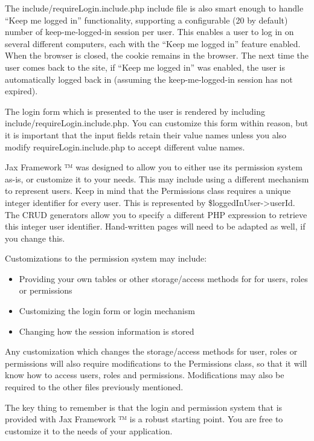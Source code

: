 \documentclass[letterpaper,10pt,english]{sphinxmanual}
\begin{document}
The include/requireLogin.include.php include file is also smart enough to handle ``Keep me logged in''
functionality, supporting a configurable (20 by default) number of keep-me-logged-in session per
user.  This enables a user to log in on several different computers, each with the ``Keep me logged
in'' feature enabled.  When the browser is closed, the cookie remains in the browser.  The next time
the user comes back to the site, if ``Keep me logged in'' was enabled, the user is automatically
logged back in (assuming the keep-me-logged-in session has not expired).

The login form which is presented to the user is rendered by including
include/requireLogin.include.php.  You can customize this form within reason, but it is important
that the input fields retain their value names unless you also modify requireLogin.include.php to
accept different value names.

Jax Framework ™ was designed to allow you to either use its permission system as-is, or
customize it to your needs.  This may include using a different mechanism to represent users.  Keep
in mind that the Permissions class requires a unique integer identifier for every user.  This is
represented by \$loggedInUser-\textgreater{}userId.  The CRUD generators allow you to specify a different PHP
expression to retrieve this integer user identifier.  Hand-written pages will need to be adapted as
well, if you change this.

Customizations to the permission system may include:
\begin{itemize}
\item {} 
Providing your own tables or other storage/access methods for for users, roles or permissions

\item {} 
Customizing the login form or login mechanism

\item {} 
Changing how the session information is stored

\end{itemize}

Any customization which changes the storage/access methods for user, roles or permissions will also
require modifications to the Permissions class, so that it will know how to access users, roles and
permissions.  Modifications may also be required to the other files previously mentioned.

The key thing to remember is that the login and permission system that is provided with Jax
Framework ™ is a robust starting point.  You are free to customize it to the needs of your
application.
\end{document}
